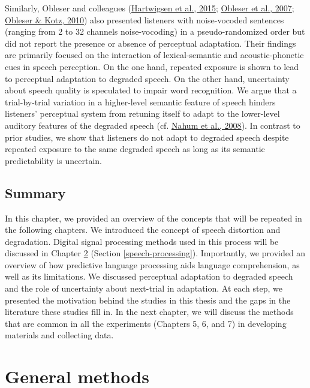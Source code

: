 \documentclass[a4paper, nobind]{templates/ociamthesis}
\begin{document}
Similarly, Obleser and colleagues (\protect\hyperlink{ref-Hartwigsen2015}{Hartwigsen et al., 2015}; \protect\hyperlink{ref-Obleser2007}{Obleser et al., 2007}; \protect\hyperlink{ref-Obleser2010}{Obleser \& Kotz, 2010}) also presented listeners with noise-vocoded sentences (ranging from 2 to 32 channels noise-vocoding) in a pseudo-randomized order but did not report the presence or absence of perceptual adaptation.
Their findings are primarily focused on the interaction of lexical-semantic and acoustic-phonetic cues in speech perception.
On the one hand, repeated exposure is shown to lead to perceptual adaptation to degraded speech.
On the other hand, uncertainty about speech quality is speculated to impair word recognition.
We argue that a trial-by-trial variation in a higher-level semantic feature of speech hinders listeners' perceptual system from retuning itself to adapt to the lower-level auditory features of the degraded speech (cf. \protect\hyperlink{ref-Nahum2008}{Nahum et al., 2008}).
In contrast to prior studies, we show that listeners do not adapt to degraded speech despite repeated exposure to the same degraded speech
as long as its semantic predictability is uncertain.

\hypertarget{summary}{%
\section{Summary}\label{summary}}

In this chapter, we provided an overview of the concepts that will be repeated in the following chapters.
We introduced the concept of speech distortion and degradation.
Digital signal processing methods used in this process will be discussed in Chapter \ref{chapter-methods} (Section \ref{speech-processing}).
Importantly, we provided an overview of how predictive language processing aids language comprehension,
as well as its limitations.
We discussed perceptual adaptation to degraded speech and the role of uncertainty about next-trial in adaptation.
At each step, we presented the motivation behind the studies in this thesis
and the gaps in the literature these studies fill in.
In the next chapter, we will discuss the methods that are common in all the experiments (Chapters 5, 6, and 7) in developing materials and collecting data.

\hypertarget{chapter-methods}{%
\chapter{General methods}\label{chapter-methods}}
\end{document}
